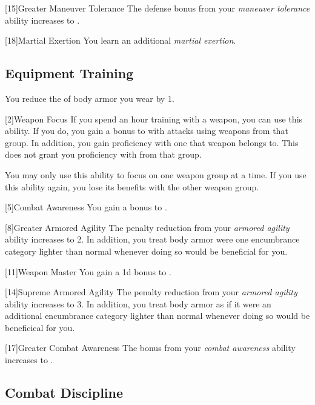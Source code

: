         [15]{Greater Maneuver Tolerance} The defense bonus from your \textit{maneuver tolerance} ability increases to .

        [18]{Martial Exertion}
        You learn an additional \textit{martial exertion}.

    \subsection{Equipment Training}
        You reduce the  of body armor you wear by 1.

        [2]{Weapon Focus}
        If you spend an hour training with a weapon, you can use this ability.
        If you do, you gain a  bonus to  with attacks using weapons from that group.
        In addition, you gain proficiency with one  that weapon belongs to.
        This does not grant you proficiency with  from that group.

        You may only use this ability to focus on one weapon group at a time.
        If you use this ability again, you lose its benefits with the other weapon group.

        [5]{Combat Awareness}
        You gain a  bonus to .

        [8]{Greater Armored Agility}
        The penalty reduction from your \textit{armored agility} ability increases to 2.
        In addition, you treat body armor were one encumbrance category lighter than normal whenever doing so would be beneficial for you.

        [11]{Weapon Master} 
        You gain a \plus1d bonus to .

        [14]{Supreme Armored Agility}
        The penalty reduction from your \textit{armored agility} ability increases to 3.
        In addition, you treat body armor as if it were an additional encumbrance category lighter than normal whenever doing so would be beneficical for you.

        [17]{Greater Combat Awareness} 
        The bonus from your \textit{combat awareness} ability increases to .

    \subsection{Combat Discipline}

